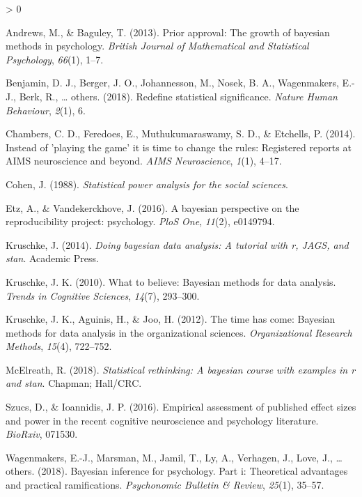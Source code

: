 \documentclass[10pt,a4paper,onecolumn]{article}
\newlength{\cslhangindent}
\newenvironment{CSLReferences}[2] %
 {%
  \setlength{\parindent}{0pt}
  \ifodd #1 \everypar{\setlength{\hangindent}{\cslhangindent}}\ignorespaces\fi
  \ifnum #2 > 0
  \setlength{\parskip}{#2\baselineskip}
  \fi
 }%
 {}
\begin{document}
\hypertarget{refs}{}
\begin{CSLReferences}{1}{0}
\leavevmode\hypertarget{ref-andrews2013prior}{}%
Andrews, M., \& Baguley, T. (2013). Prior approval: The growth of
bayesian methods in psychology. \emph{British Journal of Mathematical
and Statistical Psychology}, \emph{66}(1), 1--7.

\leavevmode\hypertarget{ref-benjamin2018redefine}{}%
Benjamin, D. J., Berger, J. O., Johannesson, M., Nosek, B. A.,
Wagenmakers, E.-J., Berk, R., \ldots{} others. (2018). Redefine
statistical significance. \emph{Nature Human Behaviour}, \emph{2}(1), 6.

\leavevmode\hypertarget{ref-chambers2014instead}{}%
Chambers, C. D., Feredoes, E., Muthukumaraswamy, S. D., \& Etchells, P.
(2014). Instead of 'playing the game' it is time to change the rules:
Registered reports at AIMS neuroscience and beyond. \emph{AIMS
Neuroscience}, \emph{1}(1), 4--17.

\leavevmode\hypertarget{ref-cohen1988statistical}{}%
Cohen, J. (1988). \emph{Statistical power analysis for the social
sciences}.

\leavevmode\hypertarget{ref-etz2016bayesian}{}%
Etz, A., \& Vandekerckhove, J. (2016). A bayesian perspective on the
reproducibility project: psychology. \emph{PloS One}, \emph{11}(2),
e0149794.

\leavevmode\hypertarget{ref-kruschke2014doing}{}%
Kruschke, J. (2014). \emph{Doing bayesian data analysis: A tutorial with
r, JAGS, and stan}. Academic Press.

\leavevmode\hypertarget{ref-kruschke2010believe}{}%
Kruschke, J. K. (2010). What to believe: Bayesian methods for data
analysis. \emph{Trends in Cognitive Sciences}, \emph{14}(7), 293--300.

\leavevmode\hypertarget{ref-kruschke2012time}{}%
Kruschke, J. K., Aguinis, H., \& Joo, H. (2012). The time has come:
Bayesian methods for data analysis in the organizational sciences.
\emph{Organizational Research Methods}, \emph{15}(4), 722--752.

\leavevmode\hypertarget{ref-mcelreath2018statistical}{}%
McElreath, R. (2018). \emph{Statistical rethinking: A bayesian course
with examples in r and stan}. Chapman; Hall/CRC.

\leavevmode\hypertarget{ref-szucs2016empirical}{}%
Szucs, D., \& Ioannidis, J. P. (2016). Empirical assessment of published
effect sizes and power in the recent cognitive neuroscience and
psychology literature. \emph{BioRxiv}, 071530.

\leavevmode\hypertarget{ref-wagenmakers2018bayesian}{}%
Wagenmakers, E.-J., Marsman, M., Jamil, T., Ly, A., Verhagen, J., Love,
J., \ldots{} others. (2018). Bayesian inference for psychology. Part i:
Theoretical advantages and practical ramifications. \emph{Psychonomic
Bulletin \& Review}, \emph{25}(1), 35--57.

\end{CSLReferences}
\end{document}
